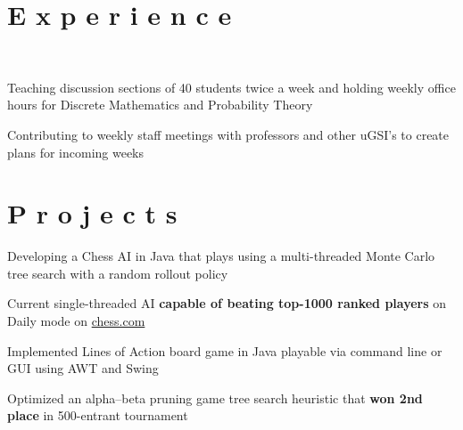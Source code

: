 \documentclass[]{deedy-resume-openfont}
\begin{document}
\begin{minipage}[t]{0.66\textwidth} 


\section{E x p e r i e n c e}
\vspace{4pt}
 \\
\vspace{\topsep} %
\beforetightemize{} %
\begin{tightemize}
\item Teaching discussion sections of 40 students twice a week and holding weekly office hours for Discrete Mathematics and Probability Theory
\item Contributing to weekly staff meetings with professors and other uGSI’s to create plans for incoming weeks
\end{tightemize}
\vspace{4pt}


\section{P r o j e c t s}
\vspace{4pt}
\begin{tightemize}
\item Developing a Chess AI in Java that plays using a multi-threaded Monte Carlo tree search with a random rollout policy
\item Current single-threaded AI \textbf{capable of beating top-1000 ranked players} on Daily mode on \href{https://www.chess.com/}{chess.com}
\end{tightemize}
\sectionsep

\begin{tightemize}
\item Implemented Lines of Action board game in Java playable via command line or GUI using AWT and Swing
\item Optimized an alpha–beta pruning game tree search heuristic that \textbf{won 2nd place} in 500-entrant tournament
\end{tightemize}
\sectionsep


\end{minipage}
\end{document}
